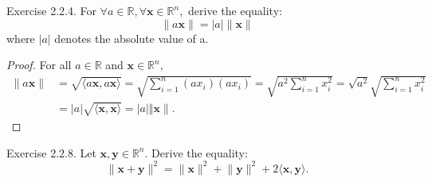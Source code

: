 \documentclass{article}
\theoremstyle{plain}
\begin{document}
\begin{itembox}[l]{Exercise 2.2.4.}
  For
  \begin{math}
    \forall a \in \mathbb{R} , \forall \bm{x} \in \mathbb{R}^n ,
  \end{math}
  derive the equality:
  \begin{equation}
    \label{ex224}
    \lVert a \bm{x} \rVert = \lvert a \rvert \lVert \bm{x} \rVert
  \end{equation}
  where $\lvert a \rvert$ denotes the absolute value of a.
\end{itembox}

\begin{proof}
  For all
  \begin{math}
    a \in \mathbb{R}
  \end{math}
  and
  \begin{math}
    \bm{x} \in \mathbb{R}^n ,
  \end{math}
  \begin{equation*}
    \begin{split}
      \lVert a \bm{x} \rVert &= \sqrt{\langle a \bm{x} , a \bm{x} \rangle} = \sqrt{\sum_{i=1}^n (a x_i)(a x_i)} = \sqrt{a^2 \sum_{i=1}^n x_i^2} = \sqrt{a^2} \sqrt{\sum_{i=1}^n x_i^2} \\
      &= \lvert a \rvert \sqrt{\langle \bm{x} , \bm{x} \rangle} = \lvert a \rvert \Vert \bm{x} \rVert .
    \end{split}
  \end{equation*}
\end{proof}

\begin{itembox}[l]{Exercise 2.2.8.}
  Let 
  \begin{math}
    \bm{x} , \bm{y} \in \mathbb{R}^n .
  \end{math}
  Derive the equality:
  \begin{equation}
    \label{ex228}
    \lVert \bm{x} + \bm{y} \rVert^2 = \lVert \bm{x} \rVert^2 + \lVert \bm{y} \rVert^2 + 2 \langle \bm{x} , \bm{y} \rangle .
  \end{equation}
\end{itembox}
\end{document}
